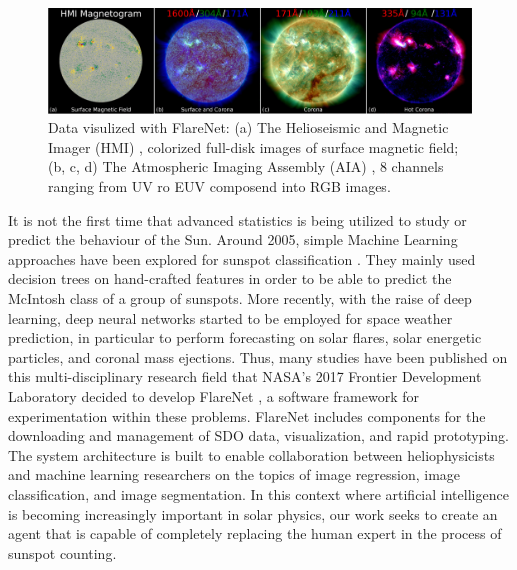 \bigbreak
\begin{figure}[t!]
    \centering
    \captionsetup{justification=centering}
    \includegraphics[width=\textwidth]{./pictures/flarenet}
    \caption{Data visulized with FlareNet: (a) The Helioseismic and Magnetic Imager (HMI) \cite{schou2012design}, colorized full-disk images of surface magnetic field; (b, c, d) The Atmospheric Imaging Assembly (AIA) \cite{lemen2011atmospheric}, 8 channels ranging from UV ro EUV composend into RGB images.}
    \label{fig:flarenet}
\end{figure}
\noindent It is not the first time that advanced statistics is being utilized to study or predict the behaviour of the Sun. Around 2005, simple Machine Learning approaches have been explored for sunspot classification \cite{colak2007automatic}\cite{nguyen2006learning}\cite{nguyen2005rough}. They mainly used decision trees on hand-crafted features in order to be able to predict the McIntosh class of a group of sunspots. More recently, with the raise of deep learning, deep neural networks started to be employed for space weather prediction, in particular to perform forecasting on solar flares, solar energetic particles, and coronal mass ejections. Thus, many studies have been published on this multi-disciplinary research field that NASA's 2017 Frontier Development Laboratory decided to develop FlareNet \cite{McGregor2017}, a software framework for experimentation within these problems. FlareNet includes components for the downloading and management of SDO data, visualization, and rapid prototyping. The system architecture is built to enable collaboration between heliophysicists and machine learning researchers on the topics of image regression, image classification, and image segmentation.
\bigbreak
\noindent In this context where artificial intelligence is becoming increasingly important in solar physics, our work seeks to create an agent that is capable of completely replacing the human expert in the process of sunspot counting.
